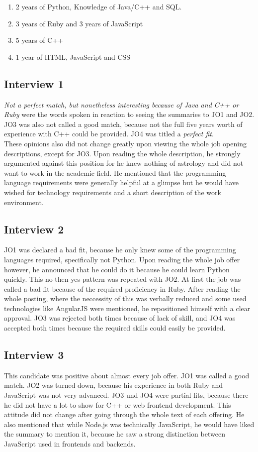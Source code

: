 \begin{enumerate}
\item 2 years of Python, Knowledge of Java/C++ and SQL.
\item 3 years of Ruby and 3 years of JavaScript
\item 5 years of C++
\item 1 year of HTML, JavaScript and CSS
\end{enumerate}

\subsection{Interview 1}
\textit{Not a perfect match, but nonetheless interesting because of Java and C++ or Ruby} were the words spoken in reaction to seeing the summaries to JO1 and JO2. JO3 was also not called a good match, because not the full five years worth of experience with C++ could be provided. JO4 was titled a \textit{perfect fit}.\\
These opinions also did not change greatly upon viewing the whole job opening descriptions, except for JO3. Upon reading the whole description, he strongly argumented against this position for he knew nothing of astrology and did not want to work in the academic field. He mentioned that the programming language requirements were generally helpful at a glimpse but he would have wished for technology requirements and a short description of the work environment.

\subsection{Interview 2}
JO1 was declared a bad fit, because he only knew some of the programming languages required, specifically not Python. Upon reading the whole job offer however, he announced that he could do it because he could learn Python quickly. This no-then-yes-pattern was repeated with JO2. At first the job was called a bad fit because of the required proficiency in Ruby. After reading the whole posting, where the neccessity of this was verbally reduced and some used technologies like AngularJS were mentioned, he repositioned himself with a clear approval. JO3 was rejected both times because of lack of skill, and JO4 was accepted both times because the required skills could easily be provided.

\subsection{Interview 3}
This candidate was positive about almost every job offer. JO1 was called a good match. JO2 was turned down, because his experience in both Ruby and JavaScript was not very advanced. JO3 und JO4 were partial fits, because there he did not have a lot to show for C++ or web frontend development. This attitude did not change after going through the whole text of each offering. He also mentioned that while Node.js was technically JavaScript, he would have liked the summary to mention it, because he saw a strong distinction between JavaScript used in frontends and backends.

